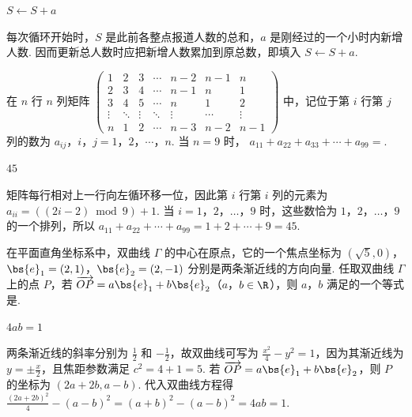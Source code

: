 \begin{answer}
\(S\leftarrow S+a\)
\end{answer}

\begin{solution}
每次循环开始时，\(S\) 是此前各整点报道人数的总和，\(a\) 是刚经过的一个小时内新增人数. 因而更新总人数时应把新增人数累加到原总数，即填入 \(S\leftarrow S+a\).
\end{solution}

\begin{problem}
在 \(n\) 行 \(n\) 列矩阵 \(\begin{pmatrix}1 & 2 & 3 & \cdots & n - 2 & n - 1 & n\\ 2 & 3 & 4 & \cdots & n - 1 & n & 1\\ 3 & 4 & 5 & \cdots & n & 1 & 2\\ \vdots & \ddots & \vdots & \ddots & \vdots & \cdots & \vdots\\ n & 1 & 2 & \cdots & n - 3 & n - 2 & n - 1 \end{pmatrix}\) 中，记位于第 \(i\) 行第 \(j\) 列的数为 \(a_{ij}\)，\(i\)，\(j = 1\)，\(2\)，\(\cdots\)，\(n\). 当 \(n = 9\) 时， \( a_{11} + a_{22} + a_{33} + \cdots + a_{99} = \)\fillinblank{}.
\end{problem}

\begin{answer}
\(45\)
\end{answer}

\begin{solution}
矩阵每行相对上一行向左循环移一位，因此第 \(i\) 行第 \(i\) 列的元素为
\(a_{ii}=((2i-2)\bmod 9)+1\).
当 \(i=1\)，\(2\)，\(\ldots\)，\(9\) 时，这些数恰为 \(1\)，\(2\)，\(\ldots\)，\(9\) 的一个排列，所以
\(a_{11}+a_{22}+\cdots+a_{99}=1+2+\cdots+9=45\).
\end{solution}

\begin{problem}
在平面直角坐标系中，双曲线 \(\Gamma\) 的中心在原点，它的一个焦点坐标为 \((\sqrt{5},0)\)，\(\bs{e}_1 = (2,1)\)，\(\bs{e}_2 = (2,-1)\) 分别是两条渐近线的方向向量. 任取双曲线 \(\Gamma\) 上的点 \(P\)，若 \(\overrightarrow{OP} = a\bs{e}_1 + b\bs{e}_2\)（\(a\)，\(b \in \R\)），则 \(a\)，\(b\) 满足的一个等式是\fillinblank{}.
\end{problem}

\begin{answer}
\(4ab=1\)
\end{answer}

\begin{solution}
两条渐近线的斜率分别为 \(\frac{1}{2}\) 和 \(-\frac{1}{2}\)，故双曲线可写为
\(\frac{x^2}{4}-y^2=1\)，因为其渐近线为 \(y=\pm\frac{x}{2}\)，且焦距参数满足 \(c^2=4+1=5\).
若 \(\overrightarrow{OP}=a\bs{e}_1+b\bs{e}_2\)，则 \(P\) 的坐标为 \((2a+2b,a-b)\). 代入双曲线方程得
\(\frac{(2a+2b)^2}{4}-(a-b)^2=(a+b)^2-(a-b)^2=4ab=1\).
\end{solution}

